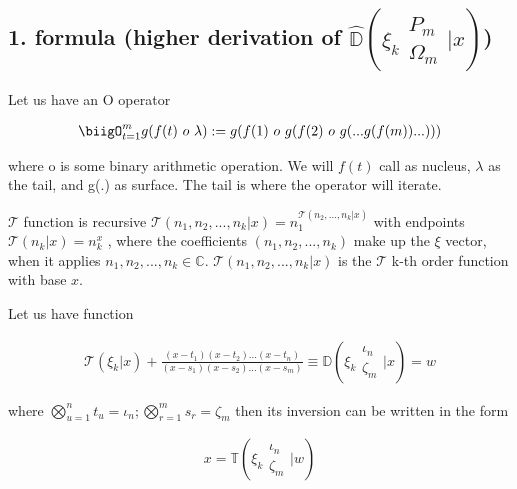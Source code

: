 \subsection{1. formula (higher derivation of 
      \(\hat{\mathbb{D}}\left( \xi_k \begin{matrix} 
      P_m \\ \Omega_m \end{matrix} \bigg| x  \right)\))}
      
\begin{definition}
      Let us have an O  operator
      
      \begin{align}
            \biigO_{t = 1}^m g(f(t) \ o \  \lambda) :=
            g(f(1) \ o \  g(f(2) \ o \   g(... g(f(m) )...)))
      \end{align}
      
      where o is some binary arithmetic operation. 
      We will \(f(t)\) call as nucleus, \(\lambda\) 
      as the tail, and g(.) as surface. The tail is 
      where the operator will iterate.
\end{definition}

\begin{definition}
      \(\mathcal{T}\) function is recursive \(\mathcal{T}(n_1, 
      n_2, ..., n_k | x) = n_1^{\mathcal{T}(n_2, ..., n_k | x)}\) 
      with endpoints \(\mathcal{T}(n_k | x ) = n_k^x\) , 
      where the coefficients  \((n_1, n_2, ..., n_k)\) make up the
      \(\xi\) vector,
      when it applies \(n_1, n_2, ..., n_k \in  \mathbb{C}\).  
      \(\mathcal{T}(n_1, n_2, ..., n_k | x) \) is the \(\mathcal{T
      }\) k-th order function with base \(x\).
\end{definition}

\begin{definition}
      Let us have function

      \begin{align}
            \mathcal{T}(\xi_k |x) + \frac{(x-t_1)(x-t_2)...
            (x-t_n)}{(x-s_1)(x-s_2)...(x-s_m)} \equiv 
            \mathbb{D}\left( \xi_k \begin{matrix} \iota_n
            \\ \zeta_m \end{matrix} \bigg| x \right)=w
      \end{align}

      where \(\bigotimes_{u=1}^n t_u = \iota_n; 
      \bigotimes_{r=1}^m s_r = \zeta_m\)
      then its inversion can be written in the form

      \begin{align}
            x = \mathbb{T}\left( \xi_k \begin{matrix} \iota_n 
            \\ \zeta_m \end{matrix} \bigg| w \right)
      \end{align}

\end{definition}

